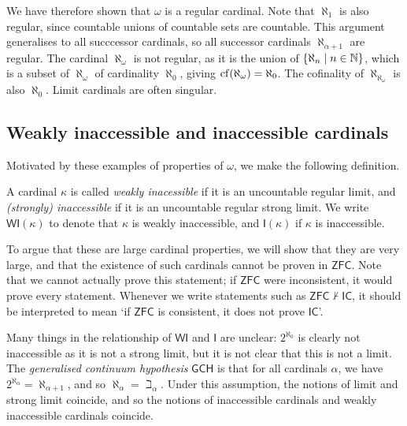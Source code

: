 \begin{enumerate}
    We have therefore shown that \( \omega \) is a regular cardinal.
    Note that \( \aleph_1 \) is also regular, since countable unions of countable sets are countable.
    This argument generalises to all succcessor cardinals, so all successor cardinals \( \aleph_{\alpha + 1} \) are regular.
    The cardinal \( \aleph_\omega \) is not regular, as it is the union of \( \qty{\aleph_n \mid n \in \mathbb N} \), which is a subset of \( \aleph_\omega \) of cardinality \( \aleph_0 \), giving \( \operatorname{cf}(\aleph_\omega) = \aleph_0 \).
    The cofinality of \( \aleph_{\aleph_\omega} \) is also \( \aleph_0 \).
    Limit cardinals are often singular.
\end{enumerate}

\subsection{Weakly inaccessible and inaccessible cardinals}
Motivated by these examples of properties of \( \omega \), we make the following definition.

\begin{definition}
    A cardinal \( \kappa \) is called \emph{weakly inacessible} if it is an uncountable regular limit, and \emph{(strongly) inaccessible} if it is an uncountable regular strong limit.
    We write \( \mathsf{WI}(\kappa) \) to denote that \( \kappa \) is weakly inaccessible, and \( \mathsf{I}(\kappa) \) if \( \kappa \) is inaccessible.
\end{definition}

To argue that these are large cardinal properties, we will show that they are very large, and that the existence of such cardinals cannot be proven in \( \mathsf{ZFC} \).
Note that we cannot actually prove this statement; if \( \mathsf{ZFC} \) were inconsistent, it would prove every statement.
Whenever we write statements such as \( \mathsf{ZFC} \nvdash \mathsf{IC} \), it should be interpreted to mean `if \( \mathsf{ZFC} \) is consistent, it does not prove \( \mathsf{IC} \)'.

Many things in the relationship of \( \mathsf{WI} \) and \( \mathsf{I} \) are unclear: \( 2^{\aleph_0} \) is clearly not inaccessible as it is not a strong limit, but it is not clear that this is not a limit.
The \emph{generalised continuum hypothesis} \( \mathsf{GCH} \) is that for all cardinals \( \alpha \), we have \( 2^{\aleph_\alpha} = \aleph_{\alpha + 1} \), and so \( \aleph_\alpha = \beth_\alpha \).
Under this assumption, the notions of limit and strong limit coincide, and so the notions of inaccessible cardinals and weakly inaccessible cardinals coincide.

